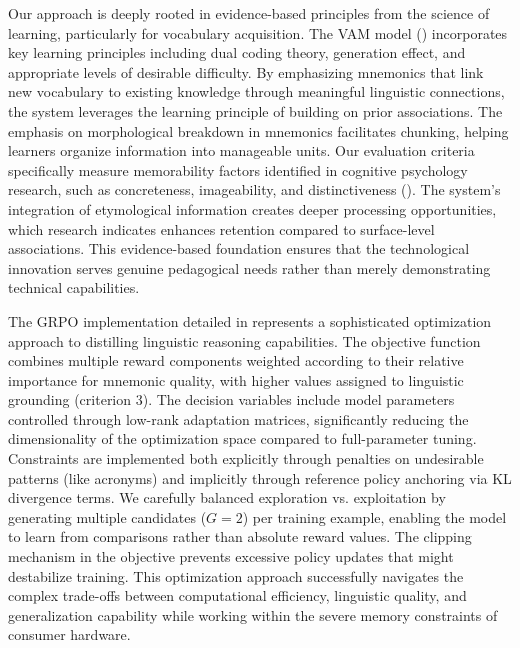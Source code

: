 Our approach is deeply rooted in evidence-based principles from the science of learning, particularly for vocabulary acquisition. The VAM model () incorporates key learning principles including dual coding theory, generation effect, and appropriate levels of desirable difficulty. By emphasizing mnemonics that link new vocabulary to existing knowledge through meaningful linguistic connections, the system leverages the learning principle of building on prior associations. The emphasis on morphological breakdown in mnemonics facilitates chunking, helping learners organize information into manageable units. Our evaluation criteria specifically measure memorability factors identified in cognitive psychology research, such as concreteness, imageability, and distinctiveness (). The system's integration of etymological information creates deeper processing opportunities, which research indicates enhances retention compared to surface-level associations. This evidence-based foundation ensures that the technological innovation serves genuine pedagogical needs rather than merely demonstrating technical capabilities.

 The GRPO implementation detailed in  represents a sophisticated optimization approach to distilling linguistic reasoning capabilities. The objective function combines multiple reward components weighted according to their relative importance for mnemonic quality, with higher values assigned to linguistic grounding (criterion 3). The decision variables include model parameters controlled through low-rank adaptation matrices, significantly reducing the dimensionality of the optimization space compared to full-parameter tuning. Constraints are implemented both explicitly through penalties on undesirable patterns (like acronyms) and implicitly through reference policy anchoring via KL divergence terms. We carefully balanced exploration vs. exploitation by generating multiple candidates ($G=2$) per training example, enabling the model to learn from comparisons rather than absolute reward values. The clipping mechanism in the objective prevents excessive policy updates that might destabilize training. This optimization approach successfully navigates the complex trade-offs between computational efficiency, linguistic quality, and generalization capability while working within the severe memory constraints of consumer hardware.

